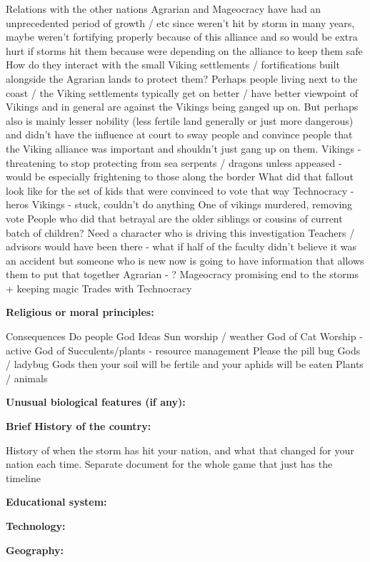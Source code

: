 \documentclass[blue]{GL2020}
\begin{document}
Relations with the other nations
Agrarian and Mageocracy have had an unprecedented period of growth / etc since weren’t hit by storm in many years, maybe weren’t fortifying properly because of this alliance and so would be extra hurt if storms hit them because were depending on the alliance to keep them safe
How do they interact with the small Viking settlements / fortifications built alongside the Agrarian lands to protect them?  Perhaps people living next to the coast / the Viking settlements typically get on better / have better viewpoint of Vikings and in general are against the Vikings being ganged up on.  But perhaps also is mainly lesser nobility (less fertile land generally or just more dangerous) and didn’t have the influence at court to sway people and convince people that the Viking alliance was important and shouldn’t just gang up on them.  
Vikings - threatening to stop protecting from sea serpents / dragons unless appeased - would be especially frightening to those along the border
What did that fallout look like for the set of kids that were convinced to vote that way
Technocracy - heros
Vikings - stuck, couldn’t do anything
One of vikings murdered, removing vote
People who did that betrayal are the older siblings or cousins of current batch of children?
Need a character who is driving this investigation
Teachers / advisors would have been there - what if half of the faculty didn’t believe it was an accident but someone who is new now is going to have information that allows them to put that together
Agrarian - ?
Mageocracy promising end to the storms + keeping magic 
Trades with Technocracy

\textbf{Religious or moral principles:}

Consequences
Do people
God Ideas
Sun worship / weather
God of Cat Worship - active
God of Succulents/plants - resource management
Please the pill bug Gods / ladybug Gods then your soil will be fertile and your aphids will be eaten
Plants / animals

\textbf{Unusual biological features (if any):}

\textbf{Brief History of the country:}

History of when the storm has hit your nation, and what that changed for your nation each time.
Separate document for the whole game that just has the timeline

\textbf{Educational system:}

\textbf{Technology:}

\textbf{Geography:}
\end{document}
